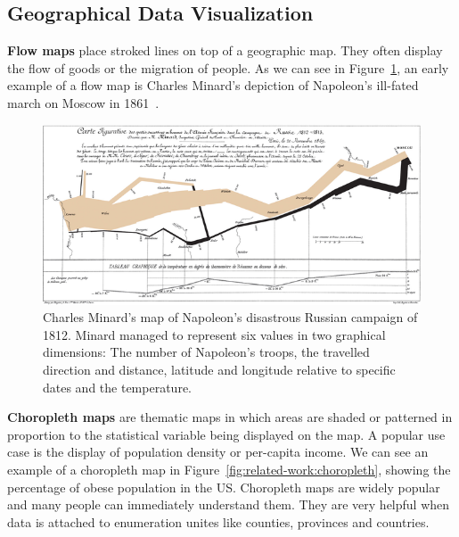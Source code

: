 \subsection{Geographical Data Visualization}
\textbf{Flow maps} place stroked lines on top of a geographic map.
They often display the flow of goods or the migration of people.
As we can see in Figure~\ref{fig:related-work:flow-map}, an early example of a flow map is Charles Minard’s depiction of Napoleon’s ill-fated march on Moscow in 1861~\cite{Corbett2001}.
\begin{figure}[ht]
  \centering
  \includegraphics[width=\textwidth]{images/theory/minard}
  \caption{%
    Charles Minard's map of Napoleon's disastrous Russian campaign of 1812.
    Minard managed to represent six values in two graphical dimensions:
    The number of Napoleon's troops, the travelled direction and distance, latitude and longitude relative to specific dates and the temperature.
  }\label{fig:related-work:flow-map}
\end{figure}

\textbf{Choropleth maps} are thematic maps in which areas are shaded or patterned in proportion to the statistical variable being displayed on the map.
A popular use case is the display of population density or per-capita income.
We can see an example of a choropleth map in Figure~\ref{fig:related-work:choropleth}, showing the percentage of obese population in the US\@.
Choropleth maps are widely popular and many people can immediately understand them.
They are very helpful when data is attached to enumeration unites like counties, provinces and countries.

